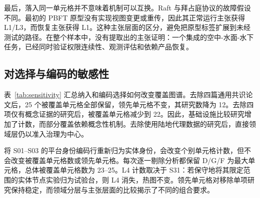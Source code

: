 最后，落入同一单元格并不意味着机制可以互换。Raft 与拜占庭协议的故障假设不同\citep{raft2014,pbft1999,hotstuff2019,narwhal2022}。最初的 PBFT 原型没有实现视图变更或重传，因此其正常运行主张获得 L1/L3，而恢复主张获得 L1。这种主张层面的区分，避免把原型标签扩展到未经测试的路径。在整个样本中，没有提取出的主张证明：一个集成的空中-水面-水下任务，已经同时验证权限连续性、观测评估和依赖产品恢复。

\subsection{对选择与编码的敏感性}\label{sec:sensitivity}

表~\ref{tab:sensitivity} 汇总纳入和编码选择如何改变覆盖图谱。去除四篇通用共识论文后，25 个被覆盖单元格全部保留，领先单元格不变，其研究数降为 12。去除四项仅有概念证据的研究后，被覆盖单元格减少到 22。因此，基础设施比较研究增加了计数，而部分覆盖依赖概念性机制。去除使用陆地代理数据的研究后，直接领域层仍以准入治理为中心。

将 S01--S03 的平台身份编码行重新归为实体身份，会改变个别单元格计数，但不会改变被覆盖单元格数或领先单元格。每次逐一剔除分析都保留 D/G/F 为最大单元格，总体被覆盖单元格数为 23--25。L4 计数取决于 S31：若保守地将其限定范围的实体节点实验归为试验台，则 L4 消失，热图不变。领先单元格对移除单项研究保持稳定，而领域分层与主张层面的比较揭示了不同的组合要求。
